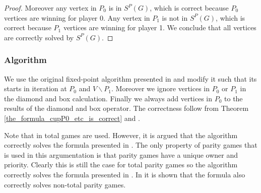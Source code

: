 \begin{theorem}
\begin{proof}
		Moreover any vertex in $P_0$ is in $S^P(G)$, which is correct because $P_0$ vertices are winning for player 0. Any vertex in $P_1$ is not in $S^P(G)$, which is correct because $P_1$ vertices are winning for player 1. We conclude that all vertices are correctly solved by $S^P(G)$.
	\end{proof}
\end{theorem}

\subsubsection{Algorithm}
We use the original fixed-point algorithm presented in \cite{FPITE} and modify it such that its starts in iteration at $P_0$ and $V\backslash P_1$. Moreover we ignore vertices in $P_0$ or $P_1$ in the diamond and box calculation. Finally we always add vertices in $P_0$ to the results of the diamond and box operator. The correctness follow from Theorem \ref{the_formula_cupP0_etc_is_correct} and \cite{FPITE,WALUKIEWICZ2002311}.

Note that in \cite{FPITE} total games are used. However, it is argued that the algorithm correctly solves the formula presented in \cite{WALUKIEWICZ2002311}. The only property of parity games that is used in this argumentation is that parity games have a unique owner and priority. Clearly this is still the case for total parity games so the algorithm correctly solves the formula presented in \cite{WALUKIEWICZ2002311}. In \cite{WALUKIEWICZ2002311} it is shown that the formula also correctly solves non-total parity games.

